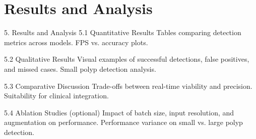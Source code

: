 \section{Results and Analysis}
\label{sec:results}

5. Results and Analysis
    5.1 Quantitative Results
        Tables comparing detection metrics across models.
        FPS vs. accuracy plots.

    5.2 Qualitative Results
        Visual examples of successful detections, false positives, and missed cases.
        Small polyp detection analysis.

    5.3 Comparative Discussion
        Trade-offs between real-time viability and precision.
        Suitability for clinical integration.

    5.4 Ablation Studies (optional)
        Impact of batch size, input resolution, and augmentation on performance.
        Performance variance on small vs. large polyp detection.